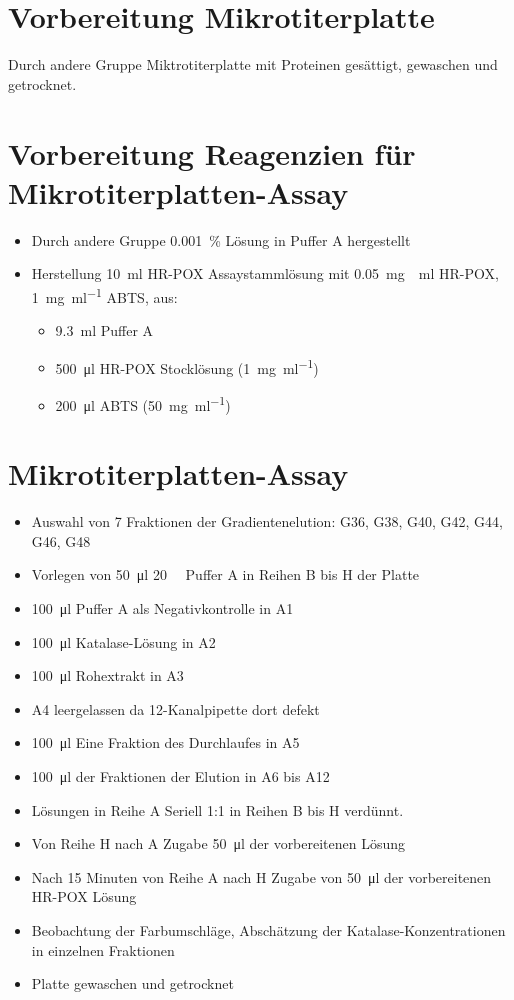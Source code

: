 \documentclass[a4paper,german]{scrreprt}
\begin{document}
\section{Vorbereitung Mikrotiterplatte}

Durch andere Gruppe Miktrotiterplatte mit Proteinen gesättigt, gewaschen und
getrocknet.

\section{Vorbereitung Reagenzien für Mikrotiterplatten-Assay}

\begin{itemize}
	\item Durch andere Gruppe \SI{0.001}{\percent}  Lösung in Puffer A hergestellt
	\item Herstellung \SI{10}{ml} HR-POX Assaystammlösung mit \SI{0.05}{\mg
		\per \ml} HR-POX, \SI{1}{\mg \per \ml} ABTS, aus:
		\begin{itemize}
			\item \SI{9.3}{\ml} Puffer A
			\item \SI{500}{\ul} HR-POX Stocklösung (\SI{1}{\mg \per \ml})
			\item \SI{200}{\ul} ABTS (\SI{50}{\mg \per \ml})
		\end{itemize}
\end{itemize}

\section{Mikrotiterplatten-Assay}

\begin{itemize}
	\item Auswahl von 7 Fraktionen der Gradientenelution: G36, G38, G40,
		G42, G44, G46, G48
	\item Vorlegen von \SI{50}{\ul} \SI{20}{\milli\Molar} Puffer A in
		Reihen B bis H der Platte
	\item \SI{100}{\ul} Puffer A als Negativkontrolle in A1
	\item \SI{100}{\ul} Katalase-Lösung in A2
	\item \SI{100}{\ul} Rohextrakt in A3
	\item A4 leergelassen da 12-Kanalpipette dort defekt
	\item \SI{100}{\ul} Eine Fraktion des Durchlaufes in A5
	\item \SI{100}{\ul} der Fraktionen der Elution in A6 bis A12
	\item Lösungen in Reihe A Seriell 1:1 in Reihen B bis H verdünnt.
	\item Von Reihe H nach A Zugabe \SI{50}{\ul} der vorbereitenen
		 Lösung
	\item Nach 15 Minuten von Reihe A nach H Zugabe von \SI{50}{\ul} der
		vorbereitenen HR-POX Lösung
	\item Beobachtung der Farbumschläge, Abschätzung der
		Katalase-Konzentrationen in einzelnen Fraktionen
	\item Platte gewaschen und getrocknet
\end{itemize}
\end{document}
